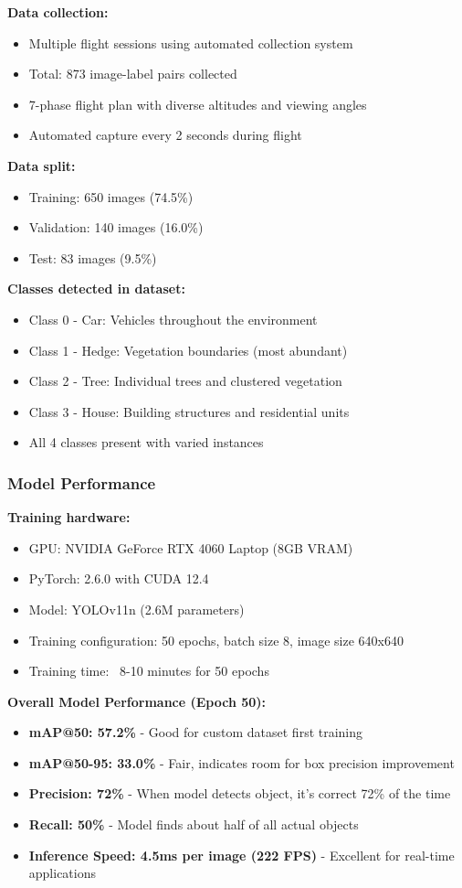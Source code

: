 \textbf{Data collection:}
\begin{itemize}
	\item Multiple flight sessions using automated collection system
	\item Total: 873 image-label pairs collected
	\item 7-phase flight plan with diverse altitudes and viewing angles
	\item Automated capture every 2 seconds during flight
\end{itemize}

\textbf{Data split:}
\begin{itemize}
	\item Training: 650 images (74.5\%)
	\item Validation: 140 images (16.0\%)
	\item Test: 83 images (9.5\%)
\end{itemize}

\textbf{Classes detected in dataset:}
\begin{itemize}
	\item Class 0 - Car: Vehicles throughout the environment
	\item Class 1 - Hedge: Vegetation boundaries (most abundant)
	\item Class 2 - Tree: Individual trees and clustered vegetation
	\item Class 3 - House: Building structures and residential units
	\item All 4 classes present with varied instances
\end{itemize}

\subsubsection{Model Performance}

\textbf{Training hardware:}
\begin{itemize}
	\item GPU: NVIDIA GeForce RTX 4060 Laptop (8GB VRAM)
	\item PyTorch: 2.6.0 with CUDA 12.4
	\item Model: YOLOv11n (2.6M parameters)
	\item Training configuration: 50 epochs, batch size 8, image size 640x640
	\item Training time: ~8-10 minutes for 50 epochs
\end{itemize}

\textbf{Overall Model Performance (Epoch 50):}
\begin{itemize}
	\item \textbf{mAP@50: 57.2\%} - Good for custom dataset first training
	\item \textbf{mAP@50-95: 33.0\%} - Fair, indicates room for box precision improvement
	\item \textbf{Precision: 72\%} - When model detects object, it's correct 72\% of the time
	\item \textbf{Recall: 50\%} - Model finds about half of all actual objects
	\item \textbf{Inference Speed: 4.5ms per image (222 FPS)} - Excellent for real-time applications
\end{itemize}

